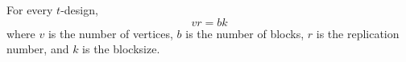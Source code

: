 For every $t$-design,
$$vr = bk$$
where $v$ is the number of vertices, $b$ is the number of blocks, $r$ is the replication number, and $k$ is the blocksize.
